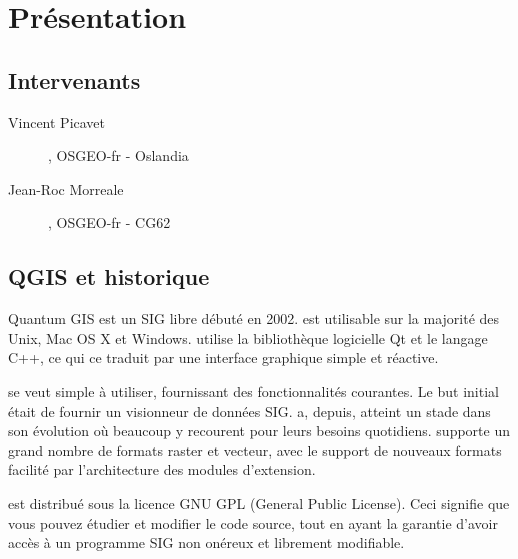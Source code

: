\mainmatter
\pagestyle{scrheadings}

\chapter{Présentation}\label{sec:qgis_presentation}

\section{Intervenants}

\begin{description}
\item[Vincent Picavet], OSGEO-fr - Oslandia
\item[Jean-Roc Morreale], OSGEO-fr - CG62
\end{description}

\section{QGIS et historique}

Quantum GIS est un SIG libre débuté en 2002. \qg est utilisable sur la majorité des Unix, Mac OS X et Windows. \qg utilise la bibliothèque logicielle Qt et le langage C++, ce qui ce traduit par une interface graphique simple et réactive.

\qg se veut simple à utiliser, fournissant des fonctionnalités courantes. Le but initial était de fournir un visionneur de données SIG. \qg a, depuis, atteint un stade dans son évolution où beaucoup y recourent pour leurs besoins quotidiens. \qg supporte un grand nombre de formats raster et vecteur, avec le support de nouveaux formats facilité par l'architecture des modules d'extension.

\qg est distribué sous la licence GNU GPL (General Public License). Ceci signifie que vous pouvez étudier et modifier le code source, tout en ayant la garantie d'avoir accès à un programme SIG non onéreux et librement modifiable.
